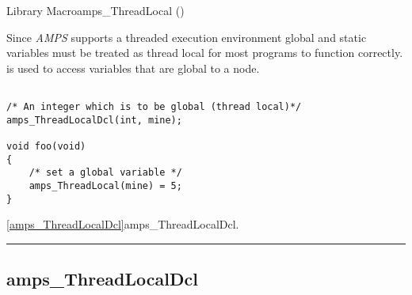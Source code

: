\begin{deftypefn}{Library Macro}{}{amps\_ThreadLocal}
()

\DESCRIPTION

Since {\em AMPS} supports a threaded execution environment global and
static variables must be treated as thread local for most programs to
function correctly.   is used to access
variables that are global to a node.

\EXAMPLE

\begin{display}\begin{verbatim}

/* An integer which is to be global (thread local)*/
amps_ThreadLocalDcl(int, mine);

void foo(void)
{
	/* set a global variable */
	amps_ThreadLocal(mine) = 5;
}

\end{verbatim}\end{display}

\SEEALSO
\vref{amps_ThreadLocalDcl}{amps\_ThreadLocalDcl}. \\

\end{deftypefn}


\noindent\rule{\textwidth}{1mm}

\subsection{amps\_ThreadLocalDcl}
\label{amps_ThreadLocalDcl}


